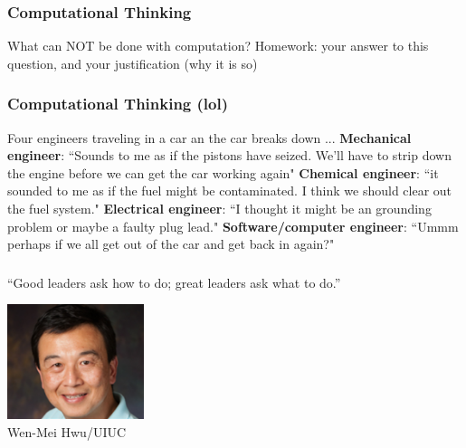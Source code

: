 \documentclass[11pt]{beamer}
\begin{document}
\begin{frame}
	\frametitle{Computational Thinking}
	\Enlarge
	\begin{itemize}
		\myitem What can NOT be done with computation? \pause
		\myitem
		\myitem \textcolor{\CSGradBot}{Homework: your answer to this question, and your justification (why it is so)}
	\end{itemize}
	
\end{frame}


\begin{frame}
	\frametitle{Computational Thinking (lol)}
	\Enlarge
	\begin{itemize} 
		\myitem Four engineers traveling in a car an the car breaks down ...
		\myitem \textbf{Mechanical engineer}: ``Sounds to me as if the pistons have seized. We'll have to strip down the engine before we can get the car working again"
		\myitem \textbf{Chemical engineer}: ``it sounded to me as if the fuel might be contaminated. I think we should clear out the fuel system."
		\myitem \textbf{Electrical engineer}: ``I thought it might be an grounding problem or maybe a faulty plug lead."
		\myitem \textbf{Software/computer engineer}: ``Ummm perhaps if we all get out of the car and get back in again?"
	\end{itemize}
\end{frame}


\begin{frame}
	\frametitle{}
	\Enlarge 
	\vspace{5mm}
	``Good leaders ask how to do; great leaders ask what to do.''
	
	\vspace{2mm}
	\hfill \includegraphics[width=0.3\textwidth]{./img/wenmei.png} \hspace{10mm} \\
	\small \hfill Wen-Mei Hwu/UIUC\\ 
\end{frame}

\end{document}

